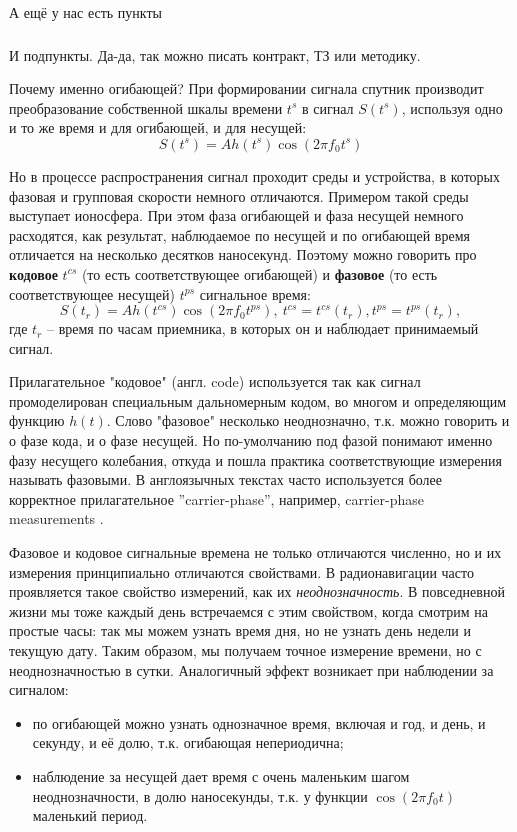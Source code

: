 \paragraph{}А ещё у нас есть пункты

\subparagraph{}И подпункты. Да-да, так можно писать контракт, ТЗ или методику.

Почему именно огибающей? 
При формировании сигнала спутник производит преобразование собственной шкалы времени $t^s$ в сигнал $S(t^s)$, используя одно и то же время и для огибающей, и для несущей:
\begin{equation}
S(t^s) = A h(t^{s}) \cos(2\pi f_0 t^s) 
\end{equation}

Но в процессе распространения сигнал проходит среды и устройства, в которых фазовая и групповая скорости немного отличаются.
Примером такой среды выступает ионосфера. 
При этом фаза огибающей и фаза несущей немного расходятся, как результат, наблюдаемое по несущей и по огибающей время отличается на несколько десятков наносекунд. 
Поэтому можно говорить про \textbf{кодовое} $t^{cs}$ (то есть соответствующее огибающей) и \textbf{фазовое} (то есть соответствующее несущей) $t^{ps}$ сигнальное время:
\begin{equation}
S\left(t_r\right) = A h\left(t^{cs}\right) \cos\left(2\pi f_0 t^{ps}\right),\   t^{cs}=t^{cs}\left(t_{r}\right), t^{ps}=t^{ps}\left(t_{r}\right),
\label{eq:signalTimesModel_fund}
\end{equation}
\noindent где $t_r$ -- время по часам приемника, в которых он и наблюдает принимаемый сигнал. 

Прилагательное "кодовое" (англ. code) используется так как сигнал промоделирован специальным дальномерным кодом, во многом и определяющим функцию $h(t)$. 
Слово "фазовое" несколько неоднозначно, т.к. можно говорить и о фазе кода, и о фазе несущей.
Но по-умолчанию под фазой понимают именно фазу несущего колебания, откуда и пошла практика соответствующие измерения называть фазовыми. 
В англоязычных текстах часто используется более корректное прилагательное ''carrier-phase'', например, carrier-phase measurements \cite[стр. 8, 11]{rinex303_update1}.

Фазовое и кодовое сигнальные времена не только отличаются численно, но и их измерения принципиально отличаются свойствами.
В радионавигации часто проявляется такое свойство измерений, как их \textit{неоднозначность}.
В повседневной жизни мы тоже каждый день встречаемся с этим свойством, когда смотрим на простые часы: так мы можем узнать время дня, но не узнать день недели и текущую дату.
Таким образом, мы получаем точное измерение времени, но с неоднозначностью в сутки. 
Аналогичный эффект возникает при наблюдении за сигналом: 
\begin{itemize}
\item по огибающей можно узнать однозначное время, включая и год, и день, и секунду, и её долю, т.к. огибающая непериодична;
\item наблюдение за несущей дает время с очень маленьким шагом неоднозначности, в долю наносекунды, т.к. у функции $\cos(2 \pi f_0 t)$ маленький период.
\end{itemize}

